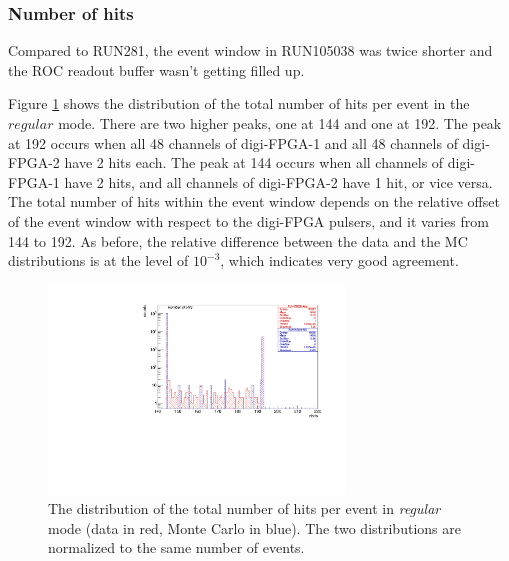 \subsubsection{Number of hits}
Compared to RUN281, the event window in RUN105038 
was twice shorter
and the ROC readout buffer wasn't getting filled up.

Figure \ref{fig:6} shows the distribution of the total 
number of hits per event in the $regular$ mode. 
There are two higher peaks, one at 144 and one at 192. 
The peak at 192 occurs when all 48 channels of digi-FPGA-1 
and all 48 channels of digi-FPGA-2 have 2 hits each. The 
peak at 144 occurs when all channels of digi-FPGA-1 have 
2 hits, and all channels of digi-FPGA-2 have 1 hit, 
or vice versa. The total number of hits within the event 
window depends on the relative offset of the event window 
with respect to the digi-FPGA pulsers, and it varies from 
144 to 192. As before, the relative difference between the 
data and the MC distributions is at the level of $10^{-3}$, 
which indicates very good agreement.
\begin{figure}[!h]
\centering
\includegraphics[width =0.7\textwidth]{figures/pdf/figure_00009_nhits_105038.pdf}
\caption[The distribution of the total number of hits per event in \textit{regular} mode.]{
  The distribution of the total number of hits per event in \textit{regular} mode 
  (data in red, Monte Carlo in blue). The two distributions 
  are normalized to the same number of events.
}
\label{fig:6}
\end{figure}


